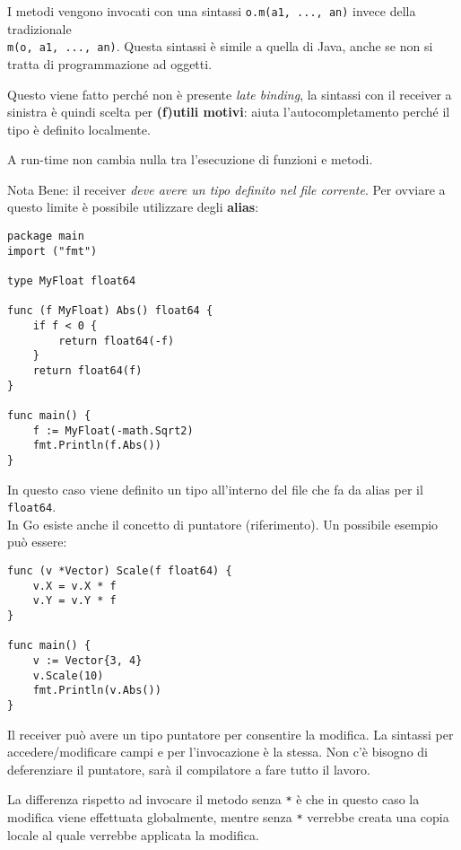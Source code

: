\documentclass{article}
\begin{document}
I metodi vengono invocati con una sintassi \texttt{o.m(a1, ..., an)} invece della tradizionale\\
\texttt{m(o, a1, ..., an)}. Questa sintassi è simile a quella di Java, anche se non si tratta di programmazione ad oggetti.

Questo viene fatto perché non è presente \textit{late binding}, la sintassi con il receiver a sinistra è quindi scelta per \textbf{(f)utili motivi}: aiuta l’autocompletamento perché il tipo è definito localmente.

A run-time non cambia nulla tra l'esecuzione di funzioni e metodi.

Nota Bene: il receiver \textit{deve avere un tipo definito nel file corrente}. Per ovviare a questo limite è possibile utilizzare degli \textbf{alias}:
\begin{tcolorbox}
\begin{verbatim}
package main
import ("fmt")

type MyFloat float64

func (f MyFloat) Abs() float64 {
    if f < 0 {
        return float64(-f)
    }
    return float64(f)
}

func main() {
    f := MyFloat(-math.Sqrt2)
    fmt.Println(f.Abs())
}
\end{verbatim}
\end{tcolorbox}
In questo caso viene definito un tipo all'interno del file che fa da alias per il \texttt{float64}.\vspace{14pt}\\
In Go esiste anche il concetto di puntatore (riferimento). Un possibile esempio può essere:
\begin{tcolorbox}
\begin{verbatim}
func (v *Vector) Scale(f float64) {
    v.X = v.X * f
    v.Y = v.Y * f
}

func main() {
    v := Vector{3, 4}
    v.Scale(10)
    fmt.Println(v.Abs())
}
\end{verbatim}
\end{tcolorbox}
Il receiver può avere un tipo puntatore per consentire la modifica. La sintassi per accedere/modificare campi e per l’invocazione è la stessa. Non c'è bisogno di deferenziare il puntatore, sarà il compilatore a fare tutto il lavoro.

La differenza rispetto ad invocare il metodo senza \texttt{*} è che in questo caso la modifica viene effettuata globalmente, mentre senza \texttt{*} verrebbe creata una copia locale al quale verrebbe applicata la modifica.
\end{document}
